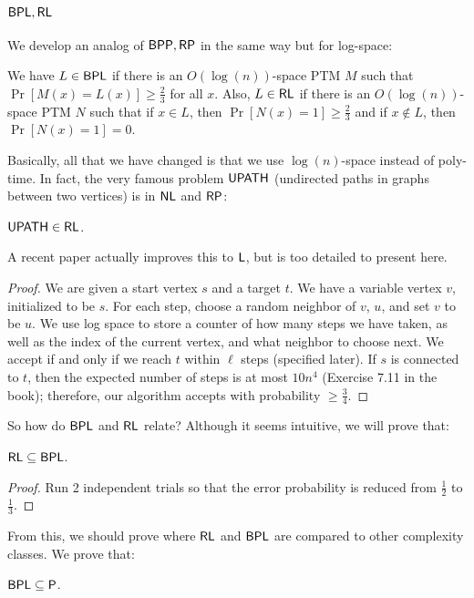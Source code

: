 \subsection{${\mathsf{BPL}}, {\mathsf{RL}}$}
We develop an analog of ${\mathsf{BPP}}, {\mathsf{RP}}$ in the same way but for log-space:
\begin{definition}
We have $L \in {\ensuremath{\mathsf{BPL}}}$ if there is an $O(\log(n))$-space PTM $M$ such that $\Pr[M(x) = L(x)] \ge \frac{2}{3}$ for all $x$. Also, $L \in {\ensuremath{\mathsf{RL}}}$ if there is an $O(\log(n))$-space PTM $N$ such that if $x \in L$, then $\Pr[N(x) = 1] \ge \frac{2}{3}$ and if $x \notin L$, then $\Pr[N(x) = 1] = 0$. 
\end{definition}
Basically, all that we have changed is that we use $\log(n)$-space instead of poly-time. In fact, the very famous problem ${\mathsf{UPATH}}$ (undirected paths in graphs between two vertices) is in ${\mathsf{NL}}$ and ${\mathsf{RP}}$:
\begin{theorem}
${\mathsf{UPATH}} \in {\ensuremath{\mathsf{RL}}}$.
\end{theorem}
A recent paper actually improves this to ${\mathsf{L}}$, but is too detailed to present here.
\begin{proof}
We are given a start vertex $s$ and a target $t$. We have a variable vertex $v$, initialized to be $s$. For each step, choose a random neighbor of $v$, $u$, and set $v$ to be $u$. We use log space to store a counter of how many steps we have taken, as well as the index of the current vertex, and what neighbor to choose next. We accept if and only if we reach $t$ within $\ell$ steps (specified later). If $s$ is connected to $t$, then the expected number of steps is at most $10n^4$ (Exercise 7.11 in the book); therefore, our algorithm accepts with probability $\ge \frac{3}{4}$. 
\end{proof}
So how do ${\mathsf{BPL}}$ and ${\mathsf{RL}}$ relate? Although it seems intuitive, we will prove that:
\begin{theorem}
${\mathsf{RL}} \subseteq {\ensuremath{\mathsf{BPL}}}$.
\end{theorem}
\begin{proof}
Run 2 independent trials so that the error probability is reduced from $\frac{1}{2}$ to $\frac{1}{3}$. 
\end{proof}
From this, we should prove where ${\mathsf{RL}}$ and ${\mathsf{BPL}}$ are compared to other complexity classes. We prove that:
\begin{theorem}
${\mathsf{BPL}} \subseteq {\ensuremath{\mathsf{P}}}$.
\end{theorem}
